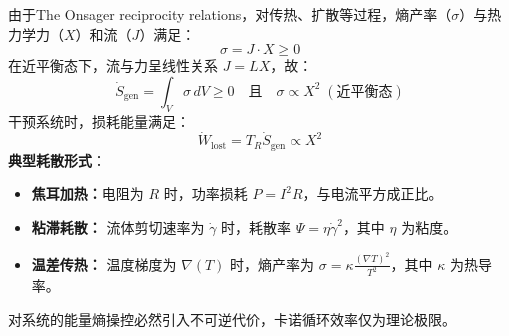 \begin{thm}
\begin{add}
\begin{itemize}
    由于The Onsager reciprocity relations，对传热、扩散等过程，熵产率（\(\sigma\)）与热力学力（\(X\)）和流（\(J\)）满足：
    \[
    \sigma = J \cdot X \geq 0
    \]
在近平衡态下，流与力呈线性关系 \(J = L X\)，故：
\[
\dot{S}_{\text{gen}} = \int_V \sigma \, dV \geq 0 \quad \text{且} \quad \sigma \propto X^2 \; (\text{近平衡态})
\]
干预系统时，损耗能量满足：
\[
\dot{W}_{\text{lost}} = T_R \dot{S}_{\text{gen}} \propto X^2 
\]
\textbf{典型耗散形式}：
\begin{itemize}
\item \textbf{焦耳加热：}电阻为 \(R\) 时，功率损耗 \(P = I^2 R\)，与电流平方成正比。
\item \textbf{粘滞耗散：} 流体剪切速率为 \(\dot{\gamma}\) 时，耗散率 \( \Psi = \eta \dot{\gamma}^2 \)，其中 \(\eta\) 为粘度。
\item \textbf{温差传热：} 温度梯度为 \(\nabla(T)\) 时，熵产率为 \( \sigma = \kappa \frac{(\nabla T)^2}{T^2} \)，其中 \(\kappa\) 为热导率。
\end{itemize}
    对系统的能量\textminus 熵操控必然引入不可逆代价，卡诺循环效率仅为理论极限。
\end{itemize}
    \end{add}
\end{thm}
